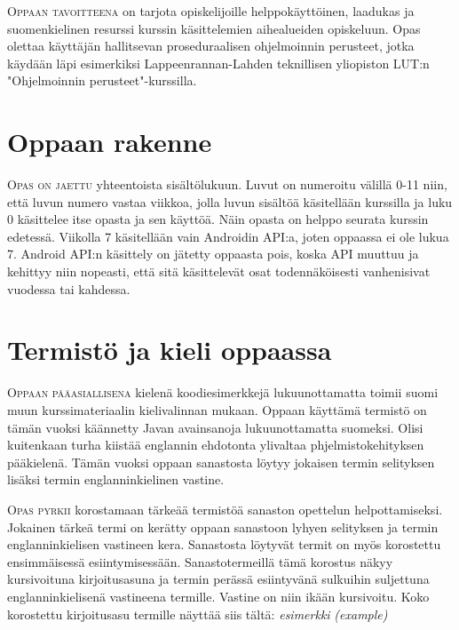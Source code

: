 \documentclass[openany]{book}
\newcommand{\newthought}[1]{\smallskip\textsc{#1}}
\newcommand{\lutin}{Lappeenrannan-Lahden teknillisen yliopiston LUT:n }
\newcommand{\eng}[1]{\textit{(#1)}}
\newcommand{\newnogls}[1]{\textit{#1}}
\newcommand{\newengnogls}[2]{\newnogls{#1} \eng{#2}}
\begin{document}
\newthought{Oppaan tavoitteena} on tarjota opiskelijoille helppokäyttöinen, laadukas ja
suomenkielinen resurssi kurssin käsittelemien aihealueiden opiskeluun. Opas olettaa käyttäjän
hallitsevan proseduraalisen ohjelmoinnin perusteet, jotka käydään läpi esimerkiksi \lutin
"Ohjelmoinnin perusteet"-kurssilla.


\section{Oppaan rakenne}
\label{rakenteesta}

\newthought{Opas on jaettu} yhteentoista sisältölukuun. Luvut on numeroitu välillä 0-11 niin, että
luvun numero vastaa viikkoa, jolla luvun sisältöä käsitellään kurssilla ja luku 0 käsittelee itse
opasta ja sen käyttöä. Näin opasta on helppo seurata kurssin edetessä. Viikolla 7 käsitellään vain
Androidin API:a, joten oppaassa ei ole lukua 7. Android API:n käsittely on jätetty oppaasta pois,
koska API muuttuu ja kehittyy niin nopeasti, että sitä käsittelevät osat todennäköisesti
vanhenisivat vuodessa tai kahdessa.


\section{Termistö ja kieli oppaassa}
\label{kielestä}

\newthought{Oppaan pääasiallisena} kielenä koodiesimerkkejä lukuunottamatta toimii suomi muun
kurssimateriaalin kielivalinnan mukaan. Oppaan käyttämä termistö on tämän vuoksi käännetty Javan
avainsanoja lukuunottamatta suomeksi. Olisi kuitenkaan turha kiistää englannin ehdotonta ylivaltaa
phjelmistokehityksen pääkielenä. Tämän vuoksi oppaan sanastosta löytyy jokaisen termin
selityksen lisäksi termin englanninkielinen vastine.

\newthought{Opas pyrkii} korostamaan tärkeää termistöä sanaston opettelun helpottamiseksi.
Jokainen tärkeä termi on kerätty oppaan sanastoon lyhyen selityksen ja termin englanninkielisen
vastineen kera. Sanastosta löytyvät termit on myös korostettu ensimmäisessä esiintymisessään.
Sanastotermeillä tämä korostus näkyy kursivoituna kirjoitusasuna ja termin perässä esiintyvänä
sulkuihin suljettuna englanninkielisenä vastineena termille. Vastine on niin ikään kursivoitu.
Koko korostettu kirjoitusasu termille näyttää siis tältä: \newengnogls{esimerkki}{example}
\end{document}
